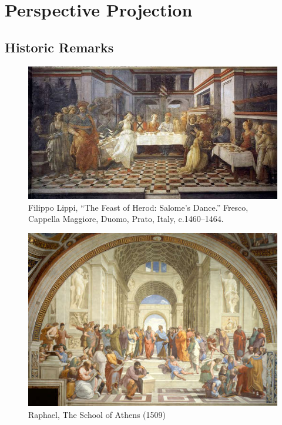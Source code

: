 \section{Perspective Projection}%
\label{sec:perspective_projection}


\subsection{Historic Remarks}%
\label{sub:historic_remarks}


\begin{figure}[h]
\centering
\includegraphics[width=\columnwidth]{img/lippi_feast_herod.jpg}
\caption{Filippo Lippi, ``The Feast of Herod: Salome's Dance.''
Fresco, Cappella Maggiore, Duomo, Prato, Italy, c.1460--1464.}%
\label{fig:lippi_feast_herod}
\end{figure}

\begin{figure}[h]
\centering
\includegraphics[width=\columnwidth]{img/raphael_school_athens.jpg}
\caption{Raphael, The School of Athens (1509)}%
\label{fig:raphael_school_athens}
\end{figure}

